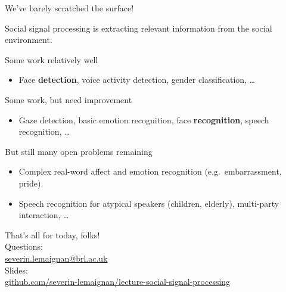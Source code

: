 \documentclass[compress]{beamer}
\makeatletter
\def\beamer@writeslidentry@miniframesoff{%
  \expandafter\beamer@ifempty\expandafter{\beamer@framestartpage}{}%
  {%
    \clearpage\beamer@notesactions%
  }
}
\newcommand*{\miniframesoff}{\let\beamer@writeslidentry=\beamer@writeslidentry@miniframesoff}
\makeatother
\begin{document}
\begin{frame}{We've barely scratched the surface!}

Social signal processing is extracting relevant information from the
social environment.

Some work relatively well

\begin{itemize}

\item Face \textbf{detection}, voice activity detection, gender
  classification, \ldots{}
\end{itemize}

Some work, but need improvement

\begin{itemize}

\item Gaze detection, basic emotion recognition, face \textbf{recognition},
  speech recognition, \ldots{}
\end{itemize}

But still many open problems remaining

\begin{itemize}

\item Complex real-word affect and emotion recognition (e.g.~embarrassment,
  pride).
\item Speech recognition for atypical speakers (children, elderly),
  multi-party interaction, \ldots{}
\end{itemize}

\end{frame}

\miniframesoff

\begin{frame}{}
    \begin{center}
        \Large
        That's all for today, folks!\\[2em]
        \normalsize
        Questions:\\
        \url{severin.lemaignan@brl.ac.uk} \\[1em]

        Slides:\\ \href{https://github.com/severin-lemaignan/lecture-social-signal-processing}{\small github.com/severin-lemaignan/lecture-social-signal-processing}

    \end{center}
\end{frame}
\end{document}
